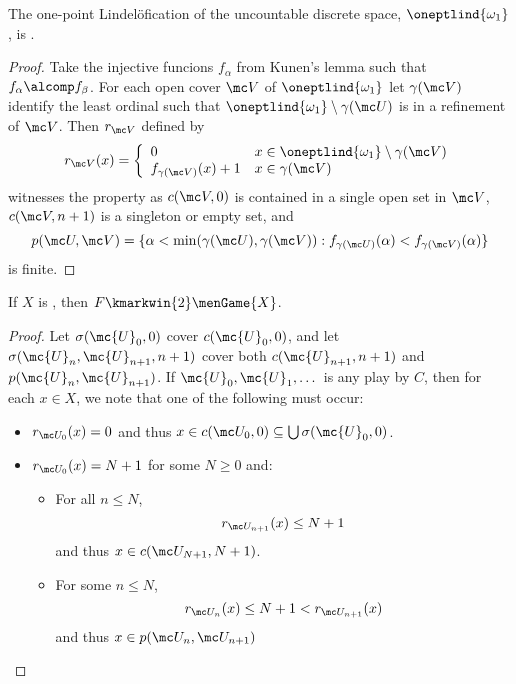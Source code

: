   \begin{thm}
    The one-point Lindel\"ofication of the uncountable discrete space, $\oneptlind{\omega_1}$, is \scish.
  \end{thm}

  \begin{proof}
    Take the injective funcions $f_\alpha$ from Kunen's lemma such that $f_\alpha \alcomp f_\beta$. For each open cover $\mc V$ of $\oneptlind{\omega_1}$ let $\gamma(\mc V)$ identify the least ordinal such that $\oneptlind{\omega_1}\setminus\gamma(\mc U)$ is in a refinement of $\mc V$. Then $r_{\mc V}$ defined by
      \[
        r_{\mc V}(x) = \left\{
      \begin{array}{ll}
        0 & x\in\oneptlind{\omega_1}\setminus\gamma(\mc V) \\
        f_{\gamma(\mc V)}(x)+1 & x\in\gamma(\mc V)
      \end{array}
      \right.
      \]
    witnesses the property as $c(\mc V,0)$ is contained in a single open set in $\mc V$, $c(\mc V,n+1)$ is a singleton or empty set, and
      \[
        p(\mc U,\mc V) = \{\alpha<\min(\gamma(\mc U),\gamma(\mc V)) : f_{\gamma(\mc U)}(\alpha)<f_{\gamma(\mc V)}(\alpha)\}
      \]
    is finite.
  \end{proof}

  \begin{thm}
    If $X$ is \scish, then $F \kmarkwin{2}\menGame{X}$.
  \end{thm}

  \begin{proof}
    Let $\sigma(\mc{U}_0,0)$ cover $c(\mc{U}_0,0)$, and let $\sigma(\mc{U}_n,\mc{U}_{n+1},n+1)$ cover both $c(\mc{U}_{n+1},n+1)$ and $p(\mc{U}_n,\mc{U}_{n+1})$. If $\mc{U}_0,\mc{U}_1,\dots$ is any play by $C$, then for each $x\in X$, we note that one of the following must occur:
      \begin{itemize}
        \item $r_{\mc U_0}(x)=0$ and thus $x\in c(\mc U_0,0)\subseteq \bigcup \sigma(\mc{U}_0,0)$.
        \item $r_{\mc U_0}(x)=N+1$ for some $N\geq 0$ and:
        \begin{itemize}
          \item For all $n\leq N$,
            \[
              r_{\mc U_{n+1}}(x)\leq N+1
            \]
            and thus $x\in c(\mc U_{N+1},N+1)$.
          \item For some $n \leq N$,
            \[
              r_{\mc U_n}(x)\leq N+1 < r_{\mc U_{n+1}}(x)
            \]
           and thus $x\in p(\mc U_n,\mc U_{n+1})$
         \end{itemize}
      \end{itemize}
  \end{proof}

